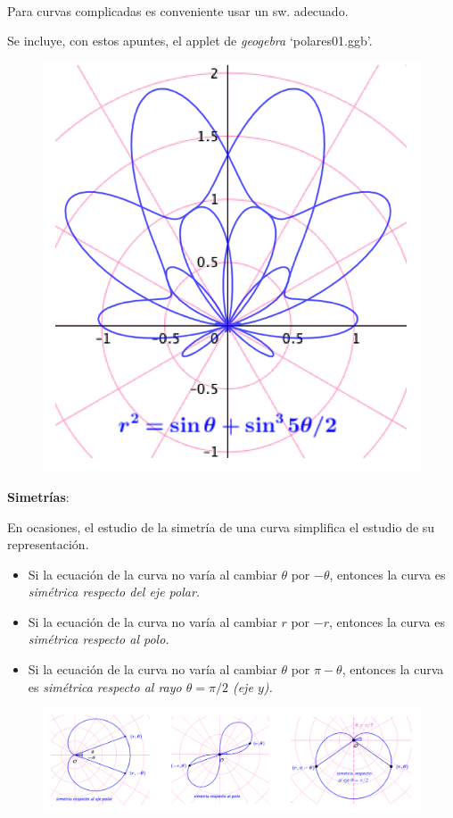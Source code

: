 \vspace{5mm}	
\begin{multicols}{2}
$\quad$ 

Para curvas complicadas es conveniente usar un sw. adecuado.

Se incluye, con estos apuntes, el applet de \emph{geogebra} \textsf{`polares01.ggb'}.	

\begin{figure}[H]
	\centering
	\includegraphics[width=.25\textwidth]{img-polares/polares30.png}
\end{figure}
\end{multicols}

\vspace{5mm}
\textbf{\large{Simetrías}}\normalsize{:}
	
	En ocasiones, el estudio de la simetría de una curva simplifica el estudio de su representación.
\vspace{-5mm}	
\begin{itemize}
\item Si la ecuación de la curva no varía al cambiar $\theta$ por $-\theta$,	 entonces la curva es \emph{simétrica respecto del eje polar.}
\item Si la ecuación de la curva no varía al cambiar $r$ por $-r$,	 entonces la curva es \emph{simétrica respecto al polo.}
\item Si la ecuación de la curva no varía al cambiar $\theta$ por $\pi-\theta$,	 entonces la curva es \emph{simétrica respecto al rayo $\theta=\pi/2$ \textcolor{gris}{(eje $y$)}.}
\end{itemize}

	
\begin{figure}[H]
	\centering
	\includegraphics[width=1\textwidth]{img-polares/polares28.png}
\end{figure}


